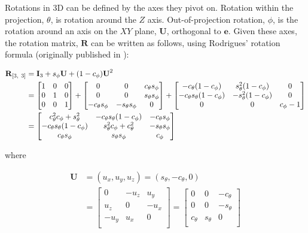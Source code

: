 \documentclass{template/monashthesis}
\begin{document}
Rotations in 3D can be defined by the axes they pivot on. Rotation within the projection, \(\theta\), is rotation around the \(Z\) axis. Out-of-projection rotation, \(\phi\), is the rotation around an axis on the \(XY\) plane, \(\textbf{U}\), orthogonal to \(\textbf{e}\). Given these axes, the rotation matrix, \(\textbf{R}\) can be written as follows, using Rodrigues' rotation formula (originally published in \textcite{rodrigues_lois_1840}):

\begin{align*}
    \textbf{R}_{[3,~3]} 
    &= \textbf{I}_3 + s_\phi\*\textbf{U} + (1-c_\phi)\*\textbf{U}^2 \\
        &=
    \begin{bmatrix}
      1 & 0 & 0 \\ 
      0 & 1 & 0 \\ 
      0 & 0 & 1 \\
    \end{bmatrix} +
    \begin{bmatrix}
      0 & 0 & c_\theta s_\phi \\
      0 & 0 & s_\theta s_\phi \\
      -c_\theta s_\phi & -s_\theta s_\phi & 0 \\
    \end{bmatrix} +
    \begin{bmatrix}
      -c_\theta (1-c_\phi) & s^2_\theta (1-c_\phi) & 0 \\
      -c_\theta s_\theta (1-c_\phi) & -s^2_\theta (1-c_\phi) & 0 \\
      0 & 0 & c_\phi-1 \\
    \end{bmatrix} \\
    &= 
    \begin{bmatrix}
      c_\theta^2 c_\phi + s_\theta^2 &
      -c_\theta s_\theta (1 - c_\phi) &
      -c_\theta s_\phi \\
      -c_\theta s_\theta (1 - c_\phi) &
      s_\theta^2 c_\phi + c_\theta^2 &
      -s_\theta s_\phi \\
      c_\theta s_\phi &
      s_\theta s_\phi &
      c_\phi
    \end{bmatrix} \\
\end{align*}

\noindent where

\begin{align*}
  \textbf{U} &= (u_x, u_y, u_z) =
  (s_\theta, -c_\theta, 0) \\ 
  &=
  \begin{bmatrix}
  0 & -u_z & u_y  \\
  u_z & 0 & -u_x \\
  -u_y & u_x & 0 \\
  \end{bmatrix} =
  \begin{bmatrix}
    0 & 0 & -c_\theta \\
    0 & 0 & -s_\theta \\
    c_\theta & s_\theta & 0 \\
  \end{bmatrix} \\
  \end{align*}
\end{document}
